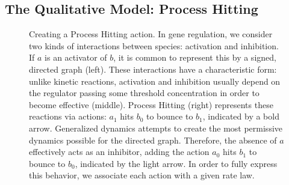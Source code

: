\documentclass{article}
\begin{document}
\subsection{The Qualitative Model: Process Hitting}\label{process_hitting}
\begin{figure}

\begin{subfigure}[t]{0.3\textwidth}
\end{subfigure}
\begin{subfigure}[b]{0.3\textwidth}
  \end{subfigure}
\begin{subfigure}[b]{0.3\textwidth}
\end{subfigure}

\caption{Creating a Process Hitting action. In gene regulation, we consider two kinds of interactions between species: activation and inhibition. If $a$ is an activator of $b$, it is common to represent this by a signed, directed graph (left). These interactions have a characteristic form: unlike kinetic reactions, activation and inhibition usually depend on the regulator passing some threshold concentration in order to become effective (middle). Process Hitting (right) represents these reactions via actions: $a_1$ hits $b_0$ to bounce to $b_1$, indicated by a bold arrow.  Generalized dynamics attempts to create the most permissive dynamics possible for the directed graph. Therefore, the absence of $a$ effectively acts as an inhibitor, adding the action $a_0$ hits $b_1$ to bounce to $b_0$, indicated by the light arrow. In order to fully express this behavior, we associate each action with a given rate law.}
\label{PH_fig}

\end{figure}
\end{document}
